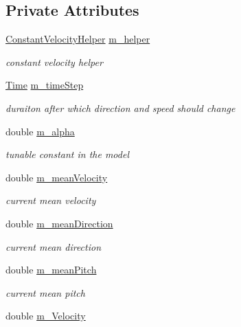 \subsection*{Private Attributes}
\begin{DoxyCompactItemize}
\item 
\hyperlink{classns3_1_1ConstantVelocityHelper}{Constant\+Velocity\+Helper} \hyperlink{classns3_1_1GaussMarkovMobilityModel_a77d329b52b1aa287f4e7a82795297884}{m\+\_\+helper}
\begin{DoxyCompactList}\small\item\em constant velocity helper \end{DoxyCompactList}\item 
\hyperlink{classns3_1_1Time}{Time} \hyperlink{classns3_1_1GaussMarkovMobilityModel_afa00618cec1c364159271f8c61d1defd}{m\+\_\+time\+Step}
\begin{DoxyCompactList}\small\item\em duraiton after which direction and speed should change \end{DoxyCompactList}\item 
double \hyperlink{classns3_1_1GaussMarkovMobilityModel_aeb2ea990f5ea57e38cf53470f613863c}{m\+\_\+alpha}
\begin{DoxyCompactList}\small\item\em tunable constant in the model \end{DoxyCompactList}\item 
double \hyperlink{classns3_1_1GaussMarkovMobilityModel_a2ceee7209674820e7b3acc075c8376b1}{m\+\_\+mean\+Velocity}
\begin{DoxyCompactList}\small\item\em current mean velocity \end{DoxyCompactList}\item 
double \hyperlink{classns3_1_1GaussMarkovMobilityModel_a357852777424aca8c6a5316293adbb9a}{m\+\_\+mean\+Direction}
\begin{DoxyCompactList}\small\item\em current mean direction \end{DoxyCompactList}\item 
double \hyperlink{classns3_1_1GaussMarkovMobilityModel_ab86745509d75f2faf71f7f42b1aab88d}{m\+\_\+mean\+Pitch}
\begin{DoxyCompactList}\small\item\em current mean pitch \end{DoxyCompactList}\item 
double \hyperlink{classns3_1_1GaussMarkovMobilityModel_a0529396d5840585a4b0be466025ed66c}{m\+\_\+\+Velocity}

\end{DoxyCompactItemize}
